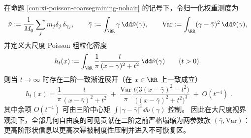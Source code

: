 \begin{proposition}\label{con:xi-poisson-coarsegraining-second-order-normal-form}
在命题 \ref{con:xi-poisson-coarsegraining-nohair} 的记号下，令归一化权重测度为
\[
\tilde\nu:=\frac{1}{M_0}\sum_{j}m_j\delta_j\,\delta_{\gamma_j},
\qquad
\bar\gamma:=\int_{\RR}\gamma\,\dd\tilde\nu(\gamma),
\qquad
\mathrm{Var}:=\int_{\RR}(\gamma-\bar\gamma)^2\,\dd\tilde\nu(\gamma),
\]
并定义大尺度 Poisson 粗粒化密度
\[
h_t(x):=\int_{\RR}\frac{1}{\pi}\frac{t}{(x-\gamma)^2+t^2}\,\dd\tilde\nu(\gamma)
\qquad (t>0).
\]
则当 \(t\to\infty\) 时存在二阶一致渐近展开（在 \(x\in\RR\) 上一致成立）
\[
\boxed{\;
h_t(x)
=
\frac{1}{\pi}\frac{t}{(x-\bar\gamma)^2+t^2}
\;+\;
\frac{\mathrm{Var}}{\pi}\,
\frac{t\bigl(3(x-\bar\gamma)^2-t^2\bigr)}{\bigl((x-\bar\gamma)^2+t^2\bigr)^3}
\;+\;O(t^{-4})\; }.
\]
其中余项 \(O(t^{-4})\) 可由三阶中心矩 \(\int|\gamma-\bar\gamma|^3\,\dd\tilde\nu(\gamma)\) 控制。
因此在大尺度视界观测下，全部几何自由度的可见贡献在二阶之前严格塌缩为两参数族 \((\bar\gamma,\mathrm{Var})\)：更高阶形状信息以更高次幂被制度性压制并进入不可恢复区。
\end{proposition}









\endinput
